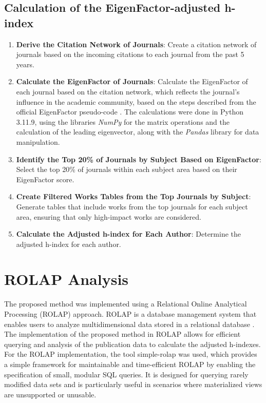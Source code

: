 \subsection{Calculation of the EigenFactor-adjusted h-index}
\begin{enumerate}
      \item \textbf{Derive the Citation Network of Journals}: Create a citation network of journals based on the
            incoming citations to each journal from the past 5 years.
      \item \textbf{Calculate the EigenFactor of Journals}: Calculate the EigenFactor of each journal based on the
            citation network, which reflects the journal's influence in the academic community, based on the steps
            described from the official EigenFactor pseudo-code \cite{west2008pseudocode}. The calculations were done  in Python
            3.11.9, using the libraries \emph{NumPy} for the matrix operations and the
            calculation of the leading eigenvector, along with the \emph{Pandas} library
            for data manipulation.
      \item \textbf{Identify the Top 20\% of Journals by Subject Based on EigenFactor}: Select the top 20\% of journals within
            each subject area based on their EigenFactor score\@.

      \item \textbf{Create Filtered Works Tables from the Top Journals by Subject}: Generate tables that include works from
            the top journals for each subject area, ensuring that only high-impact works are considered.

      \item \textbf{Calculate the Adjusted h-index for Each Author}: Determine the adjusted h-index for each author.
\end{enumerate}

\section{ROLAP Analysis}

The proposed method was implemented using a Relational Online Analytical
Processing (ROLAP) approach. ROLAP is a database management system that enables
users to analyze multidimensional data stored in a relational database
\cite{codd1993providing}. The implementation of the proposed method in ROLAP
allows for efficient querying and analysis of the publication data to calculate
the adjusted h-indexes. For the ROLAP implementation, the tool simple-rolap
\cite{simple-rolap} was used, which provides a simple framework for
maintainable and time-efficient ROLAP by enabling the specification of small,
modular SQL queries. It is designed for querying rarely modified data sets and
is particularly useful in scenarios where materialized views are unsupported or
unusable.

